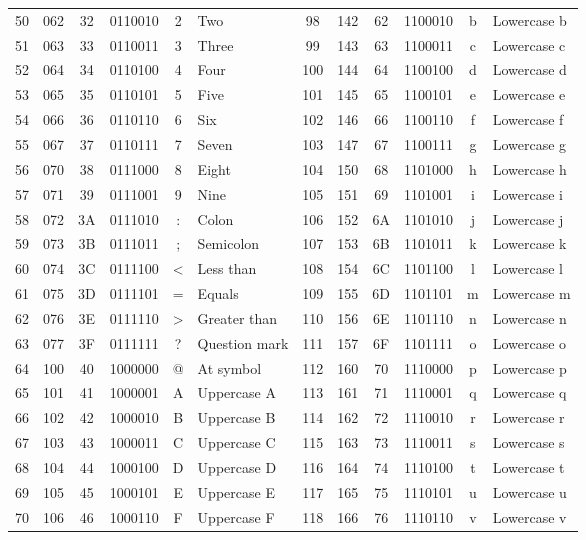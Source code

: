 \begin{definition}[ASCII]
{\begin{tabular}{ |c|c|c|c|c|l|c|c|c|c|c|l| }
        50 & 062 & 32& 0110010 & 2 & Two & 98 & 142 & 62& 1100010 &b&Lowercase b\\
        51 & 063 & 33& 0110011 & 3 & Three & 99 & 143 & 63& 1100011 &c&Lowercase c\\
        52 & 064 & 34& 0110100 & 4 & Four & 100 & 144 & 64& 1100100 &d&Lowercase d\\
        53 & 065 & 35& 0110101 & 5 & Five & 101 & 145 & 65& 1100101 &e&Lowercase e\\
        54 & 066 & 36& 0110110 & 6 & Six & 102 & 146 & 66& 1100110 &f&Lowercase f\\
        55 & 067 & 37& 0110111 & 7 & Seven & 103 & 147 & 67 &1100111 &g&Lowercase g\\
        56 & 070 & 38& 0111000 & 8 & Eight & 104 & 150 & 68& 1101000 &h&Lowercase h\\
        57 & 071 & 39& 0111001 & 9 & Nine & 105 & 151 & 69& 1101001 &i&Lowercase i\\
        58 & 072 & 3A& 0111010 & : & Colon & 106 & 152 & 6A& 1101010 &j&Lowercase j\\
        59 & 073 & 3B& 0111011 & ; & Semicolon & 107 & 153 & 6B& 1101011 &k&Lowercase k\\
        60 & 074 & 3C& 0111100 & < & Less than & 108 & 154 & 6C& 1101100 &l&Lowercase l\\
        61 & 075 & 3D& 0111101 & = & Equals & 109 & 155 & 6D& 1101101 &m&Lowercase m\\
        62 & 076 & 3E& 0111110 & > & Greater than & 110 & 156 & 6E& 1101110 &n&Lowercase n\\
        63 & 077 & 3F& 0111111 & ? & Question mark & 111 & 157 & 6F& 1101111 &o&Lowercase o\\
        64 & 100 & 40& 1000000 & @ & At symbol & 112 & 160 & 70& 1110000 &p&Lowercase p\\
        65 & 101 & 41& 1000001 & A & Uppercase A & 113 & 161 & 71& 1110001 &q&Lowercase q\\
        66 & 102 & 42& 1000010 & B& Uppercase B & 114 & 162 & 72& 1110010 &r&Lowercase r\\
        67 & 103 & 43& 1000011 &C&Uppercase C & 115 & 163 & 73& 1110011 &s&Lowercase s\\
        68 & 104 & 44& 1000100 &D&Uppercase D & 116 & 164 & 74& 1110100 &t&Lowercase t\\
        69 & 105 & 45& 1000101 &E&Uppercase E & 117 & 165 & 75& 1110101 &u&Lowercase u\\
        70 & 106 & 46& 1000110 &F&Uppercase F & 118 & 166 & 76& 1110110 &v&Lowercase v\\

\end{tabular}}
\end{definition}
